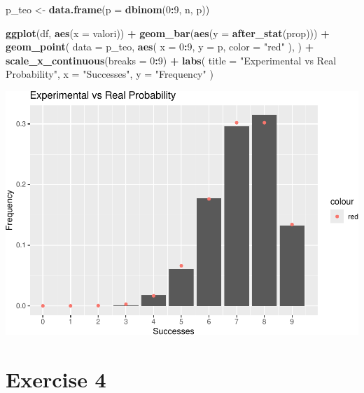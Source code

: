 \documentclass[
]{article}
\newenvironment{Shaded}{\begin{snugshade}}{\end{snugshade}}
\newcommand{\DataTypeTok}[1]{\textcolor[rgb]{0.13,0.29,0.53}{#1}}
\newcommand{\DecValTok}[1]{\textcolor[rgb]{0.00,0.00,0.81}{#1}}
\newcommand{\KeywordTok}[1]{\textcolor[rgb]{0.13,0.29,0.53}{\textbf{#1}}}
\newcommand{\NormalTok}[1]{#1}
\newcommand{\OperatorTok}[1]{\textcolor[rgb]{0.81,0.36,0.00}{\textbf{#1}}}
\newcommand{\StringTok}[1]{\textcolor[rgb]{0.31,0.60,0.02}{#1}}
\begin{document}
\begin{Shaded}
\begin{Highlighting}[]
\NormalTok{p\_teo \textless{}{-}}\StringTok{ }\KeywordTok{data.frame}\NormalTok{(}\DataTypeTok{p =} \KeywordTok{dbinom}\NormalTok{(}\DecValTok{0}\OperatorTok{:}\DecValTok{9}\NormalTok{, n, p))}

\KeywordTok{ggplot}\NormalTok{(df, }\KeywordTok{aes}\NormalTok{(}\DataTypeTok{x =}\NormalTok{ valori)) }\OperatorTok{+}
\StringTok{  }\KeywordTok{geom\_bar}\NormalTok{(}\KeywordTok{aes}\NormalTok{(}\DataTypeTok{y =} \KeywordTok{after\_stat}\NormalTok{(prop))) }\OperatorTok{+}
\StringTok{  }\KeywordTok{geom\_point}\NormalTok{(}
    \DataTypeTok{data =}\NormalTok{ p\_teo,}
    \KeywordTok{aes}\NormalTok{(}
      \DataTypeTok{x =} \DecValTok{0}\OperatorTok{:}\DecValTok{9}\NormalTok{, }\DataTypeTok{y =}\NormalTok{ p,}
      \DataTypeTok{color =} \StringTok{"red"}
\NormalTok{    ),}
\NormalTok{  ) }\OperatorTok{+}
\StringTok{  }\KeywordTok{scale\_x\_continuous}\NormalTok{(}\DataTypeTok{breaks =} \DecValTok{0}\OperatorTok{:}\DecValTok{9}\NormalTok{) }\OperatorTok{+}
\StringTok{  }\KeywordTok{labs}\NormalTok{(}
    \DataTypeTok{title =} \StringTok{"Experimental vs Real Probability"}\NormalTok{,}
    \DataTypeTok{x =} \StringTok{"Successes"}\NormalTok{,}
    \DataTypeTok{y =} \StringTok{"Frequency"}
\NormalTok{  )}
\end{Highlighting}
\end{Shaded}

\includegraphics{es_files/figure-latex/unnamed-chunk-15-1.pdf}

\hypertarget{exercise-4}{%
\section{Exercise 4}\label{exercise-4}}
\end{document}
